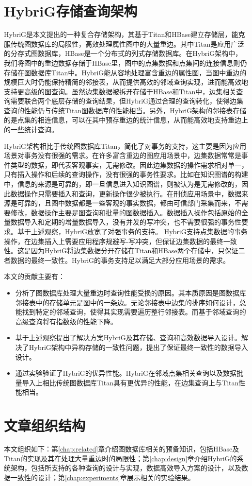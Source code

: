 \section{HybriG存储查询架构}

HybriG是本文提出的一种复合存储架构，其基于Titan和HBase建立存储层，能克服传统图数据库的局限性，高效处理属性图中的大量重边。其中Titan是应用广泛的分存式图数据库，HBase是一个分布式的列式存储数据库。在HybriG架构中，我们将图中的重边数据存储于HBase里，图中的点集数据和点集间的连接信息则仍存储在图数据库Titan中。HybriG能从容地处理富含重边的属性图，当图中重边的规模巨大时仍能保持精简的邻接表，从而提供高效的邻域查询实现，进而能高效地支持更高级的图查询。虽然边集数据被拆开存储于HBase和Titan中，边集相关查询需要联合两个底层存储的查询结果，但HybriG通过合理的查询转化，使得边集查询的性能仍与传统Titan图数据库的性能相当。另外，HybriG架构的邻接表存储的是点集的相连信息，可以在其中预存重边的统计信息，从而能高效地支持重边上的一些统计查询。

HybriG架构相比于传统图数据库Titan，简化了对事务的支持，这主要是因为应用场景对事务没有很强的需求。在许多富含重边的图应用场景中，边集数据常常是事件类型的数据，即代表客观事实，无需修改。因此边集数据的操作需求相对单一，只有插入操作和后续的查询操作，没有很强的事务性要求。比如在知识图谱的构建中\supercite{knowledge_graph}，信息的来源是可靠的，即一旦信息进入知识图谱，则被认为是无需修改的，因此数据操作只需要插入和查询，更新操作很少被执行。在刑侦应用场景中，数据来源是可靠的，且图中数据都是一些客观的事实数据，都由可信部门采集而来，不需要修改，数据操作主要是图查询和批量的图数据插入。数据插入操作包括原始的全量数据导入和定期的增量数据导入，没有并发的写冲突，也不需要很强的事务性要求。基于上述观察，HybriG放宽了对强事务的支持。
HybriG支持点集数据的事务操作，在边集插入上需要应用程序规避写-写冲突，但保证边集数据的最终一致性。这是因为HybriG将边集数据分开存储在Titan和HBase两个存储中，只保证二者数据的最终一致性。HybriG的事务支持足以满足大部分应用场景的需求。


本文的贡献主要有：

\begin{itemize}
  \item 分析了图数据库处理大量重边时查询性能受损的原因。其本质原因是图数据库邻接表中的存储单元是图中的一条边。无论邻接表中边集的排序如何设计，总能找到特定的邻域查询，使得其实现需要遍历整行邻接表。而基于邻域查询的高级查询将有指数级的性能下降。
  \item 基于上述观察提出了解决方案HybriG及其存储、查询和高效数据导入设计。解决了HybriG架构中异构存储的一致性问题，提出了保证最终一致性的数据导入设计。
  \item 通过实验验证了HybriG的优异性能。HybriG在邻域点集相关查询以及数据批量导入上相比传统图数据库Titan具有更优异的性能，在边集查询上与Titan性能相当。
\end{itemize}

\section{文章组织结构}
本文组织如下：第\ref{chap:related}章介绍图数据库相关的预备知识，包括HBase及Titan的实现及其在处理大量重边时的局限性；第\ref{chap:design}章介绍HybriG的系统架构，包括所支持的各种查询的设计与实现，数据高效导入方案的设计，以及数据一致性的设计；第\ref{chap:experiments}章展示相关的实验结果。

